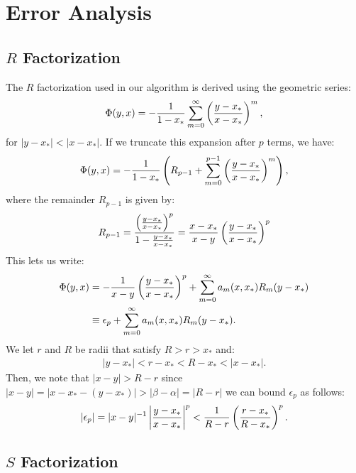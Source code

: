 \section{Error Analysis}

\subsection{$R$ Factorization}

The $R$ factorization used in our algorithm is derived using the
geometric series:
\begin{align*}
  \Phi(y, x) = -\frac{1}{1 - x_*} \sum_{m=0}^\infty \left(\frac{y - x_*}{x - x_*}\right)^m,
\end{align*}
for $|y - x_*| < |x - x_*|$. If we truncate this expansion after $p$
terms, we have:
\begin{align*}
  \Phi(y, x) = -\frac{1}{1 - x_*} \left(R_{p-1} + \sum_{m=0}^{p-1} \left(\frac{y - x_*}{x - x_*}\right)^m\right),
\end{align*}
where the remainder $R_{p-1}$ is given by:
\begin{align*}
  R_{p-1} = \frac{\left(\frac{y - x_*}{x - x_*}\right)^p}{1 - \frac{y - x_*}{x - x_*}} = \frac{x - x_*}{x - y} \left(\frac{y - x_*}{x - x_*}\right)^p
\end{align*}
This lets us write:
\begin{align*}
  \Phi(y, x) &= -\frac{1}{x - y} \left(\frac{y - x_*}{x - x_*}\right)^p + \sum_{m=0}^\infty a_m(x, x_*) R_m(y - x_*) \\
  &\equiv \epsilon_p + \sum_{m=0}^\infty a_m(x, x_*) R_m(y - x_*).
\end{align*}
We let $r$ and $R$ be radii that satisfy $R > r > x_*$ and:
\begin{align*}
  |y - x_*| < r - x_* < R - x_* < |x - x_*|.
\end{align*}
Then, we note that $|x - y| > R - r$ since
$|x - y| = |x - x_* - (y - x_*)| > |\beta - \alpha| = |R - r|$ we can
bound $\epsilon_p$ as follows:
\begin{align*}
  |\epsilon_p| = |x-y|^{-1} \left|\frac{y-x_*}{x-x_*}\right|^p < \frac{1}{R - r} \left(\frac{r - x_*}{R - x_*}\right)^p.
\end{align*}

\subsection{$S$ Factorization}


